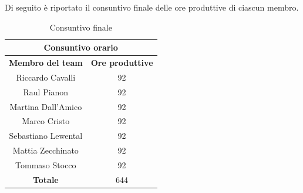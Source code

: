 \begin{minipage}{\textwidth}
Di seguito è riportato il consuntivo finale delle ore produttive di ciascun membro.
\begin{table}[H]
  \centering
  \begin{adjustbox}{max width=\textwidth}
  \begin{tabular}{|c|c|}
    \hline
    \multicolumn{2}{|c|}{\textbf{Consuntivo orario}} \\
    \hline
    \textbf{Membro del team} & \textbf{Ore produttive} \\
    \hline
    Riccardo Cavalli & 92 \\
    \hline
    Raul Pianon & 92 \\
    \hline
    Martina Dall'Amico & 92 \\
    \hline
    Marco Cristo & 92 \\
    \hline
    Sebastiano Lewental & 92 \\
    \hline
    Mattia Zecchinato & 92 \\
    \hline
    Tommaso Stocco & 92 \\
    \hline
    \textbf{Totale} & 644 \\
    \hline
  \end{tabular}
  \end{adjustbox}
  \caption{Consuntivo finale}\label{tab:consuntivo-finale}
\end{table}
\end{minipage}
